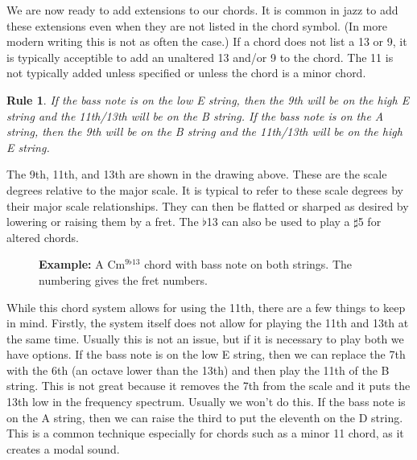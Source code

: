 \documentclass[12pt]{article}
\newtheorem{nrule}{Rule}
\theoremstyle{definition}
\begin{document}
We are now ready to add extensions to our chords. It is common in jazz to add these extensions even when they are not listed in the chord symbol. (In more modern writing this is not as often the case.) If a chord does not list a 13 or 9, it is typically acceptible to add an unaltered 13 and/or 9 to the chord. The 11 is not typically added unless specified or unless the chord is a minor chord. 

\begin{nrule}
If the bass note is on the low E string, then the 9th will be on the high E string and the 11th/13th will be on the B string. If the bass note is on the A string, then the 9th will be on the B string and the 11th/13th will be on the high E string. 
\end{nrule}

\noindent
\begin{minipage}{0.5\textwidth}
\end{minipage}
\begin{minipage}{0.5\textwidth}
\end{minipage}

The 9th, 11th, and 13th are shown in the drawing above. These are the scale degrees relative to the major scale. It is typical to refer to these scale degrees by their major scale relationships. They can then be flatted or sharped as desired by lowering or raising them by a fret. The $\flat$13 can also be used to play a $\sharp$5 for altered chords. 

\begin{figure}[H]
\noindent
\textbf{Example:} A Cm$^{9 \flat 13}$ chord with bass note on both strings. The numbering gives the fret numbers. 

\noindent
\begin{minipage}{0.5\textwidth}
\end{minipage}
\begin{minipage}{0.5\textwidth}
\end{minipage}
\end{figure}

While this chord system allows for using the 11th, there are a few things to keep in mind. Firstly, the system itself does not allow for playing the 11th and 13th at the same time. Usually this is not an issue, but if it is necessary to play both we have options. If the bass note is on the low E string, then we can replace the 7th with the 6th (an octave lower than the 13th) and then play the 11th of the B string. This is not great because it removes the 7th from the scale and it puts the 13th low in the frequency spectrum. Usually we won't do this. If the bass note is on the A string, then we can raise the third to put the eleventh on the D string. This is a common technique especially for chords such as a minor 11 chord, as it creates a modal sound. 
\end{document}
